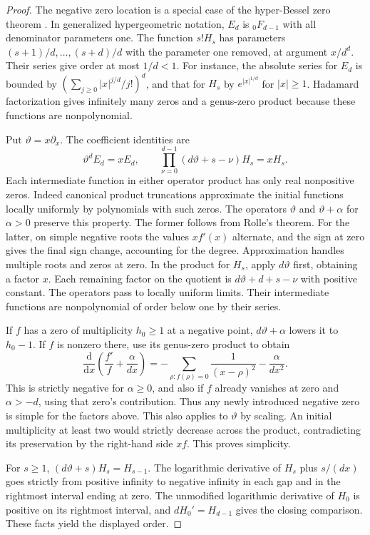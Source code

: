 \documentclass[11pt]{article}
\newcommand{\dd}{\mathrm d}
\begin{document}
\begin{proof}
The negative zero location is a special case of the hyper-Bessel
zero theorem \cite[Theorem 2]{hyperbessel}. In generalized
hypergeometric notation, \(E_d\) is \({}_0F_{d-1}\) with all
denominator parameters one. The function \(s!H_s\) has
parameters \((s+1)/d,\ldots,(s+d)/d\) with the parameter one
removed, at argument \(x/d^d\). Their series give order at
most \(1/d<1\). For instance, the absolute series for \(E_d\)
is bounded by \((\sum_{j\ge0}|x|^{j/d}/j!)^d\), and that for
\(H_s\) by \(e^{|x|^{1/d}}\) for \(|x|\ge1\).
Hadamard factorization gives infinitely many zeros and a
genus-zero product because these functions are nonpolynomial.

Put \(\vartheta=x\partial_x\). The coefficient identities are
\[
\vartheta^d E_d=xE_d,\qquad
\prod_{\nu=0}^{d-1}(d\vartheta+s-\nu)H_s=xH_s.
\]
Each intermediate function in either operator product has
only real nonpositive zeros. Indeed canonical product
truncations approximate the initial functions locally uniformly
by polynomials with such zeros. The operators \(\vartheta\)
and \(\vartheta+\alpha\) for \(\alpha>0\) preserve this property.
The former follows from Rolle's theorem. For the latter,
on simple negative roots the values \(xf'(x)\) alternate, and
the sign at zero gives the final sign change, accounting for
the degree. Approximation handles multiple roots and zeros at zero.
In the product for \(H_s\), apply \(d\vartheta\) first, obtaining
a factor \(x\). Each remaining factor on the quotient is
\(d\vartheta+d+s-\nu\) with positive constant.
The operators pass to locally uniform limits. Their intermediate
functions are nonpolynomial of order below one by their series.

If \(f\) has a zero of multiplicity \(h_0\ge1\) at a negative
point, \(d\vartheta+\alpha\) lowers it to \(h_0-1\).
If \(f\) is nonzero there, use its genus-zero product to obtain
\[
\frac{\dd}{\dd x}\left(\frac{f'}{f}+\frac{\alpha}{dx}\right)
=-\sum_{\rho:f(\rho)=0}\frac1{(x-\rho)^2}-\frac{\alpha}{dx^2}.
\]
This is strictly negative for \(\alpha\ge0\), and also if \(f\)
already vanishes at zero and \(\alpha>-d\), using that zero's
contribution. Thus any newly introduced negative zero is simple
for the factors above. This also applies to \(\vartheta\) by
scaling. An initial multiplicity at least two would strictly
decrease across the product, contradicting its preservation
by the right-hand side \(xf\). This proves simplicity.

For \(s\ge1\), \((d\vartheta+s)H_s=H_{s-1}\).
The logarithmic derivative of \(H_s\) plus \(s/(dx)\)
goes strictly from positive infinity to negative infinity
in each gap and in the rightmost interval ending at zero.
The unmodified logarithmic derivative of \(H_0\) is positive
on its rightmost interval, and \(dH_0'=H_{d-1}\) gives the
closing comparison. These facts yield the displayed order.
\end{proof}
\end{document}
